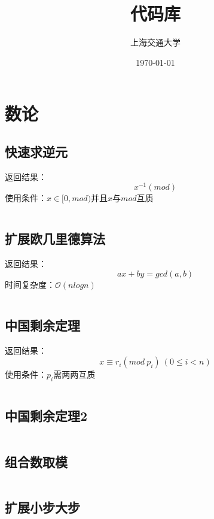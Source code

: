 \documentclass[a4paper]{article}
\title{代码库}
\author{上海交通大学}
\date{\today}
\newcommand{\cppcode}[1]{
    \inputminted[mathescape,
    frame=lines,linenos]{cpp}{source/#1}
}
\begin{document}
\maketitle

\tableofcontents

\newpage

\section{数论}

\subsection{快速求逆元}

返回结果：$$x^{-1}(mod)$$
\indent 使用条件：$x \in [0, mod)$并且$x$与$mod$互质

\cppcode{number-theory/inverse.cpp}

\subsection{扩展欧几里德算法}


返回结果：$$ax+by=gcd(a,b)$$
\indent 时间复杂度：$\mathcal{O}(nlogn)$

\cppcode{number-theory/extended-euclid.cpp}

\subsection{中国剩余定理}

返回结果：$$x \equiv r_i (mod \ p_i) \ (0 \leq i < n)$$
\indent 使用条件：$p_i$需两两互质\\

\cppcode{number-theory/chinese-remainder-theorem.cpp}

\subsection{中国剩余定理2}

\cppcode{number-theory/china2.cpp}

\subsection{组合数取模}
\cppcode{number-theory/CnmmodP.cpp}

\subsection{扩展小步大步}
\cppcode{number-theory/exBSGS.cpp}
\end{document}
